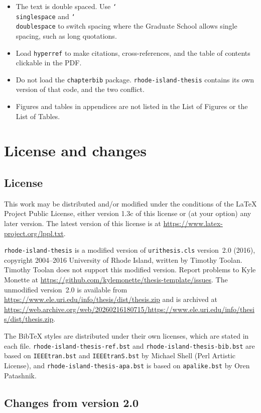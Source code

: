 \documentclass[11pt]{article}
\newcommand\cls{\texttt{rhode-island-thesis}}
\newcommand\cs[1]{\texttt{\char`\\#1}}
\newcommand\file[1]{\texttt{#1}}
\begin{document}
\begin{itemize}
\item The text is double spaced. Use \cs{singlespace} and \cs{doublespace} to
  switch spacing where the Graduate School allows single spacing, such as long
  quotations.
\item Load \texttt{hyperref} to make citations, cross-references, and the
  table of contents clickable in the PDF.
\item Do not load the \texttt{chapterbib} package. \cls{} contains its own
  version of that code, and the two conflict.
\item Figures and tables in appendices are not listed in the List of Figures
  or the List of Tables.
\end{itemize}

\section{License and changes}\label{sec:license}

\subsection{License}

This work may be distributed and/or modified under the conditions of the
\LaTeX{} Project Public License, either version 1.3c of this license or (at
your option) any later version.
The latest version of this license is at
\url{https://www.latex-project.org/lppl.txt}.

\cls{} is a modified version of \file{urithesis.cls} version~2.0 (2016),
copyright 2004--2016 University of Rhode Island, written by Timothy Toolan.
Timothy Toolan does not support this modified version.
Report problems to Kyle Monette at
\url{https://github.com/kylemonette/thesis-template/issues}.
The unmodified version~2.0 is available from
\url{https://www.ele.uri.edu/info/thesis/dist/thesis.zip}
and is archived at
\url{https://web.archive.org/web/20260216180715/https://www.ele.uri.edu/info/thesis/dist/thesis.zip}.

The Bib\TeX{} styles are distributed under their own licenses, which are
stated in each file.
\file{rhode-island-thesis-ref.bst} and \file{rhode-island-thesis-bib.bst} are based on \texttt{IEEEtran.bst} and
\texttt{IEEEtranS.bst} by Michael Shell (Perl Artistic License), and
\file{rhode-island-thesis-apa.bst} is based on \texttt{apalike.bst} by Oren Patashnik.

\subsection{Changes from version 2.0}
\end{document}

